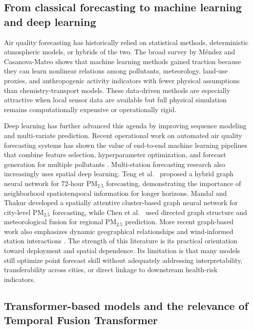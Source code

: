 \documentclass[pdflatex,sn-mathphys-num]{sn-jnl}
\begin{document}
\subsection{From classical forecasting to machine learning and deep learning}\label{subsec:forecasting}

Air quality forecasting has historically relied on statistical methods, deterministic atmospheric models, or hybrids of the two. The broad survey by M\'{e}ndez and Casanova-Mateo \cite{mendez2023survey} shows that machine learning methods gained traction because they can learn nonlinear relations among pollutants, meteorology, land-use proxies, and anthropogenic activity indicators with fewer physical assumptions than chemistry-transport models. These data-driven methods are especially attractive when local sensor data are available but full physical simulation remains computationally expensive or operationally rigid.

Deep learning has further advanced this agenda by improving sequence modeling and multi-variate prediction. Recent operational work on automated air quality forecasting systems has shown the value of end-to-end machine learning pipelines that combine feature selection, hyperparameter optimization, and forecast generation for multiple pollutants \cite{jiao2022automated}. Multi-station forecasting research also increasingly uses spatial deep learning. Teng et al.\ \cite{teng2023gnnlstm} proposed a hybrid graph neural network for 72-hour PM$_{2.5}$ forecasting, demonstrating the importance of neighborhood spatiotemporal information for longer horizons. Mandal and Thakur \cite{mandal2023sagnn} developed a spatially attentive cluster-based graph neural network for city-level PM$_{2.5}$ forecasting, while Chen et al.\ \cite{chen2025directedgnn} used directed graph structure and meteorological fusion for regional PM$_{2.5}$ prediction. More recent graph-based work also emphasizes dynamic geographical relationships and wind-informed station interactions \cite{zhao2025dggnn}. The strength of this literature is its practical orientation toward deployment and spatial dependence. Its limitation is that many models still optimize point forecast skill without adequately addressing interpretability, transferability across cities, or direct linkage to downstream health-risk indicators.

\subsection{Transformer-based models and the relevance of Temporal Fusion Transformer}\label{subsec:tft}
\end{document}

